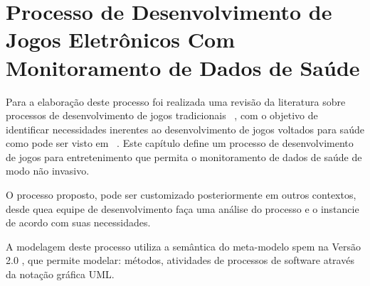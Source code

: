 \chapter{Processo de Desenvolvimento de Jogos Eletrônicos Com Monitoramento de Dados de Saúde}\label{chap:processo_desenvolvimento}

Para a elaboração deste processo foi realizada uma revisão da literatura sobre processos de desenvolvimento de jogos tradicionais ~\cite{keith2010agile,moore2011basics,rucker2003software,kanode2009}, com o objetivo de identificar necessidades inerentes ao desenvolvimento de jogos voltados para saúde como pode ser visto em ~\cite{Suhonen_2010,herber2011,bartolome11,sinclair07,Hardy2011,kato12}. Este capítulo define um processo de desenvolvimento de jogos para entretenimento que permita o monitoramento de dados de saúde de modo não invasivo. 

O processo proposto, pode ser customizado posteriormente em outros contextos, desde quea equipe de desenvolvimento faça uma análise do processo e o instancie de acordo com suas necessidades.

A modelagem deste processo utiliza a semântica do meta-modelo \ac{spem} na Versão 2.0 \cite{spem08}, que permite modelar: métodos, atividades de processos de software através da notação gráfica UML. 

